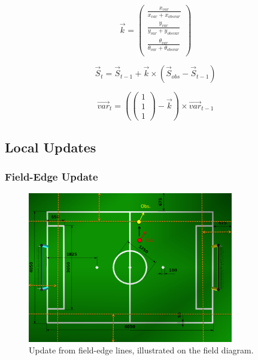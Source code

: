 \documentclass[pdftex,11pt,a4paper]{report}
\begin{document}
\begin{equation}
\label{eq:kfup0}
\vec{k} = \begin{pmatrix}
\frac{x_{var}}{x_{var} + x_{obs var}} \\
\frac{y_{var}}{y_{var} + y_{obs var}} \\
\frac{\theta_{var}}{\theta_{var} + \theta_{obs var}} \\
\end{pmatrix}
\end{equation}

\begin{equation}
\label{eq:kfup1}
\vec{S}_t
 =  \vec{S}_{t-1} +
\vec{k} \times
\left( \vec{S}_{obs} - \vec{S}_{t-1} \right)
\end{equation}

\begin{equation}
\label{eq:kfup2}
\vec{var}_t
= (
\begin{pmatrix} 1 \\ 1 \\ 1 \end{pmatrix}
 - \vec{k}) \times
\vec{var}_{t-1}
\end{equation}

\subsection{Local Updates}

\subsubsection{Field-Edge Update} \label{subsubsecFieldEdgeUpdate}

\begin{figure} [ht]
\centering
\includegraphics[width=0.8\textwidth]{figures/KFfieldEdgeUpdate}
\caption{Update from field-edge lines, illustrated on the field diagram\cite{RobocupRules}.} \label{figKFfieldEdgeUpdate}
\end{figure}
\end{document}
